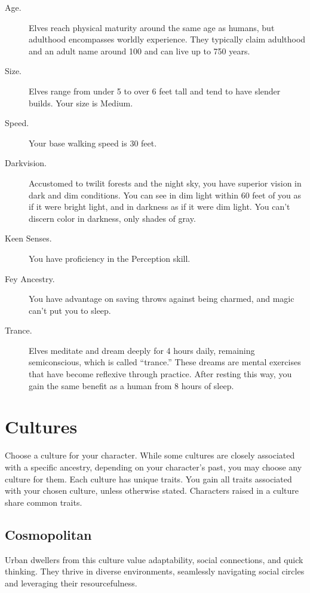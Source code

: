 \begin{description}
\item[Age.]
Elves reach physical maturity around the same age as humans, but
adulthood encompasses worldly experience. They typically claim adulthood
and an adult name around 100 and can live up to 750 years.
\item[Size.]
Elves range from under 5 to over 6 feet tall and tend to have slender
builds. Your size is Medium.
\item[Speed.]
Your base walking speed is 30 feet.
\item[Darkvision.]
Accustomed to twilit forests and the night sky, you have superior vision
in dark and dim conditions. You can see in dim light within 60 feet of
you as if it were bright light, and in darkness as if it were dim light.
You can't discern color in darkness, only shades of gray.
\item[Keen Senses.]
You have proficiency in the Perception skill.
\item[Fey Ancestry.]
You have advantage on saving throws against being charmed, and magic
can't put you to sleep.
\item[Trance.]
Elves meditate and dream deeply for 4 hours daily, remaining
semiconscious, which is called ``trance.'' These dreams are mental
exercises that have become reflexive through practice. After resting
this way, you gain the same benefit as a human from 8 hours of sleep.
\end{description}

\section{Cultures}\label{_cultures}

Choose a culture for your character. While some cultures are closely
associated with a specific ancestry, depending on your character's past,
you may choose any culture for them. Each culture has unique traits. You
gain all traits associated with your chosen culture, unless otherwise
stated. Characters raised in a culture share common traits.

\subsection{Cosmopolitan}\label{_cosmopolitan}

Urban dwellers from this culture value adaptability, social connections,
and quick thinking. They thrive in diverse environments, seamlessly
navigating social circles and leveraging their resourcefulness.

